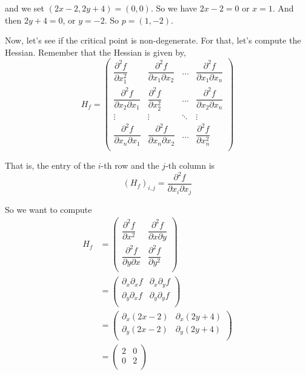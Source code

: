 and we set $\left( 2x -2, 2y + 4 \right) = \left( 0, 0 \right)$.
So we have $2x - 2 = 0$ or $x = 1$.
And then $2y + 4 = 0$, or $y = -2$.
So $p = (1, -2)$.

Now, let's see if the critical point is non-degenerate.
For that, let's compute the Hessian.
Remember that the Hessian is given by,
$$
H_f
=
\begin{pmatrix} 
    \dfrac{\partial^2 f}{\partial x_{1}^{2}}         & \dfrac{\partial^2 f}{\partial x_1 \partial x_2} & \dots  & \dfrac{\partial^2 f}{\partial x_1 \partial x_n}  \\[2.2ex]
    \dfrac{\partial^2 f}{\partial x_2 \partial x_1}  & \dfrac{\partial^2 f}{\partial x_{2}^{2}}        & \dots  & \dfrac{\partial^2 f}{\partial x_2 \partial x_n}  \\[2.2ex]
    \vdots                                           & \vdots                                          & \ddots & \vdots                                           \\[2.2ex]
    \dfrac{\partial^2 f}{\partial x_n \partial x_1}  & \dfrac{\partial^2 f}{\partial x_n \partial x_2} & \dots  & \dfrac{\partial^2 f}{\partial x_{n}^{2}}         \\
\end{pmatrix}
$$

That is, the entry of the $i$-th row and the $j$-th column is
$$
\left(H_f\right)_{i,j} = \frac{\partial^2 f}{\partial x_i \partial x_j}
$$

So we want to compute
\begin{align*}
H_f
&=
\begin{pmatrix} 
    \dfrac{\partial^2 f}{\partial x^{2}}         & \dfrac{\partial^2 f}{\partial x \partial y}  \\[2.2ex]
    \dfrac{\partial^2 f}{\partial y \partial x}  & \dfrac{\partial^2 f}{\partial y^{2}}         \\
\end{pmatrix} \\
&= \begin{pmatrix} 
    \partial_x \partial_x f  & \partial_x \partial_y f  \\[2.2ex]
    \partial_y \partial_x f  & \partial_y \partial_y f  \\
\end{pmatrix} \\
&= \begin{pmatrix} 
    \partial_x (2x -2)  & \partial_x (2y + 4)  \\[2.2ex]
    \partial_y (2x -2)  & \partial_y (2y + 4)  \\
\end{pmatrix} \\
&= \begin{pmatrix} 
    2  & 0  \\
    0  & 2  \\
\end{pmatrix}
\end{align*}

